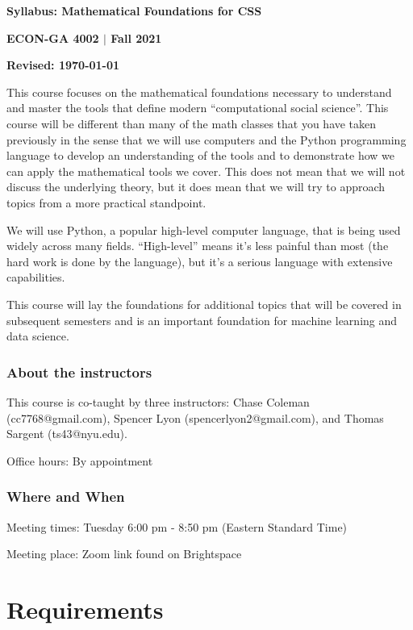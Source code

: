 \documentclass[12pt,pdftex,twoside,letterpaper]{exam}
\begin{document}
  \centerline{\Large\bf Syllabus: Mathematical Foundations for CSS}
  \vspace{3mm}
  \centerline{\large\bf ECON-GA 4002 $|$ Fall 2021}
  \vspace{3mm}
  \centerline{\bf Revised: \today}

  \bigskip

  This course focuses on the mathematical foundations necessary to understand and master the tools
  that define modern ``computational social science''. This course will be different than many of
  the math classes that you have taken previously in the sense that we will use computers and the
  Python programming language to develop an understanding of the tools and to demonstrate how we
  can apply the mathematical tools we cover. This does not mean that we will not discuss the
  underlying theory, but it does mean that we will try to approach topics from a more practical
  standpoint.

  We will use Python, a popular high-level computer language, that is being used widely across many
  fields. ``High-level'' means it's less painful than most (the hard work is done by the language),
  but it's a serious language with extensive capabilities.

  This course will lay the foundations for additional topics that will be covered in subsequent
  semesters and is an important foundation for machine learning and data science.

  \subsubsection*{About the instructors}

    This course is co-taught by three instructors: Chase Coleman (cc7768@gmail.com), Spencer Lyon
    (spencerlyon2@gmail.com), and Thomas Sargent (ts43@nyu.edu).

    Office hours: By appointment

  \subsubsection*{Where and When}

    Meeting times: Tuesday 6:00 pm - 8:50 pm (Eastern Standard Time)

    Meeting place: Zoom link found on Brightspace

  \section*{Requirements}
\end{document}
